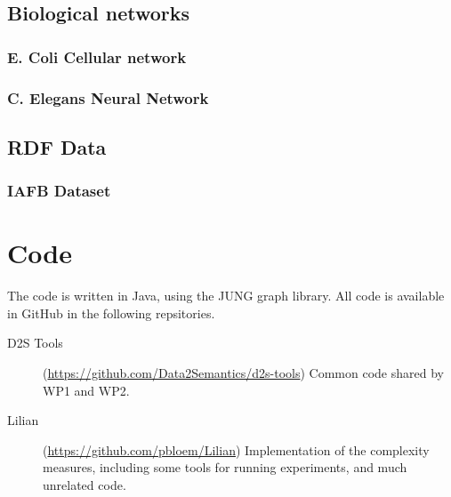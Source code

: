 \documentclass{article}
\theoremstyle{definition}
\begin{document}
\subsection*{Biological networks}
\subsubsection*{E. Coli Cellular network}
\subsubsection*{C. Elegans Neural Network}


\subsection*{RDF Data}
\subsubsection*{IAFB Dataset}


\section*{Code}

The code is written in Java, using the JUNG graph library. All code is available in GitHub in the following repsitories.
\begin{description}
\item[D2S Tools] (\url{https://github.com/Data2Semantics/d2s-tools}) Common code shared by WP1 and WP2.
\item[Lilian] (\url{https://github.com/pbloem/Lilian}) Implementation of the complexity measures, including some tools for running experiments, and much unrelated code.
\end{description}
\end{document}
